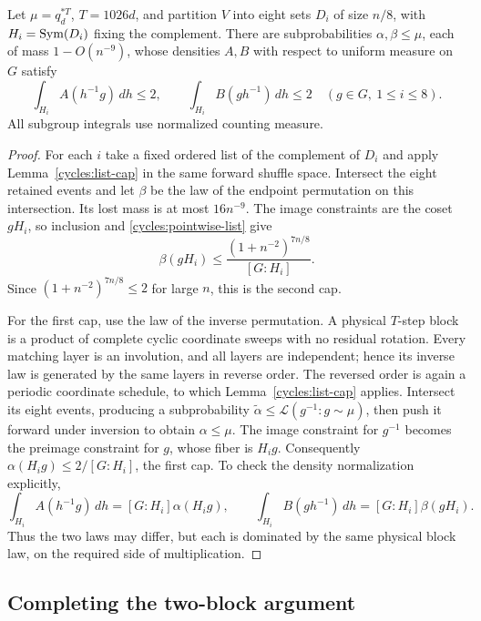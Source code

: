 \begin{lemma}
\label{cycles:two-sided-cap}
Let $\mu=q_d^{*T}$, $T=1026d$, and partition $V$ into eight sets
$D_i$ of size $n/8$, with $H_i=\operatorname{Sym}(D_i)$ fixing the complement.
There are subprobabilities $\alpha,\beta\le\mu$, each of mass
$1-O(n^{-9})$, whose densities $A,B$ with respect to uniform measure
on $G$ satisfy
\begin{equation}\label{cycles:two-sided-density}
 \int_{H_i} A(h^{-1}g)\,dh\le2,
 \qquad
 \int_{H_i} B(gh^{-1})\,dh\le2
 \quad(g\in G,\ 1\le i\le8).
\end{equation}
All subgroup integrals use normalized counting measure.
\end{lemma}
\begin{proof}
For each $i$ take a fixed ordered list of the complement of $D_i$ and
apply Lemma~\ref{cycles:list-cap} in the same forward shuffle space.
Intersect the eight retained events and let $\beta$ be the law of the
endpoint permutation on this intersection. Its lost mass is at most
$16n^{-9}$. The image constraints are the coset $gH_i$, so inclusion
and \eqref{cycles:pointwise-list} give
\[
 \beta(gH_i)\le\frac{(1+n^{-2})^{7n/8}}{[G:H_i]}.
\]
Since $(1+n^{-2})^{7n/8}\le2$ for large $n$, this is the second cap.

For the first cap, use the law of the inverse permutation. A physical
$T$-step block is a product of complete cyclic coordinate sweeps with
no residual rotation. Every matching layer is an involution, and all
layers are independent; hence its inverse law is generated by the same
layers in reverse order. The reversed order is again a periodic
coordinate schedule, to which Lemma~\ref{cycles:list-cap} applies.
Intersect its eight events, producing a subprobability
$\widetilde\alpha\le\mathcal L(g^{-1}:g\sim\mu)$, then push it
forward under inversion to obtain $\alpha\le\mu$.
The image constraint for $g^{-1}$ becomes the preimage constraint for
$g$, whose fiber is $H_ig$. Consequently
$\alpha(H_ig)\le2/[G:H_i]$, the first cap.
To check the density normalization explicitly,
\[
 \int_{H_i}A(h^{-1}g)\,dh=[G:H_i]\alpha(H_ig),\qquad
 \int_{H_i}B(gh^{-1})\,dh=[G:H_i]\beta(gH_i).
\]
Thus the two laws may differ, but each is dominated by the same physical
block law, on the required side of multiplication.
\end{proof}

\subsection{Completing the two-block argument}
\label{cycles:two-block-completion}

